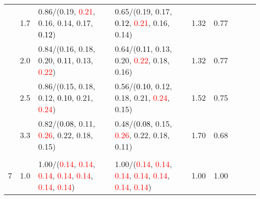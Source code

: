 \documentclass[10pt,a4paper]{report}
\begin{document}
\begin{table}[!htbp]
\begin{center}
{\begin{tabular}{ccllccccc}
				  & 1.7                               & 0.86/(0.19, \textcolor{red}{0.21}, 0.16, 0.14, 0.17, \textcolor{black}{0.12})                                                                                                                 & 0.65/(0.19, 0.17, \textcolor{black}{0.12}, \textcolor{red}{0.21}, 0.16, 0.14)                                                                                                                 & 1.32             & 0.77                     \\
				  & 2.0                               & 0.84/(0.16, 0.18, 0.20, \textcolor{black}{0.11}, 0.13, \textcolor{red}{0.22})                                                                                                                 & 0.64/(\textcolor{black}{0.11}, 0.13, 0.20, \textcolor{red}{0.22}, 0.18, 0.16)                                                                                                                 & 1.32             & 0.77                     \\
				  & 2.5                               & 0.86/(0.15, 0.18, 0.12, \textcolor{black}{0.10}, 0.21, \textcolor{red}{0.24})                                                                                                                 & 0.56/(\textcolor{black}{0.10}, 0.12, 0.18, 0.21, \textcolor{red}{0.24}, 0.15)                                                                                                                 & 1.52             & 0.75                     \\
				  & 3.3                               & 0.82/(\textcolor{black}{0.08}, 0.11, \textcolor{red}{0.26}, 0.22, 0.18, 0.15)                                                                                                                 & 0.48/(\textcolor{black}{0.08}, 0.15, \textcolor{red}{0.26}, 0.22, 0.18, 0.11)                                                                                                                 & 1.70             & 0.68                     \\
				  &                                   &                                                                                                                                                                                               &                                                                                                                                                                                               &                                             \\
				7 & 1.0                               & 1.00/(\textcolor{red}{0.14}, \textcolor{red}{0.14}, \textcolor{red}{0.14}, \textcolor{red}{0.14}, \textcolor{red}{0.14}, \textcolor{red}{0.14}, \textcolor{red}{0.14})                        & 1.00/(\textcolor{red}{0.14}, \textcolor{red}{0.14}, \textcolor{red}{0.14}, \textcolor{red}{0.14}, \textcolor{red}{0.14}, \textcolor{red}{0.14}, \textcolor{red}{0.14})                        & 1.00             & 1.00                     \\

\end{tabular}}
\end{center}
\end{table}
\end{document}
